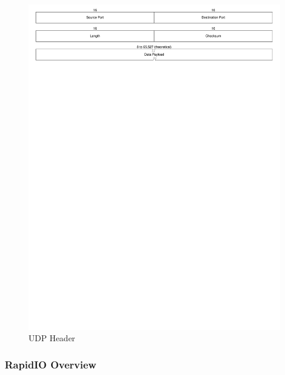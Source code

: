 \begin{landscape}
	\begin{figure}[ptb]
		\begin{centering}
			\includegraphics{Protocol/Figures/protocol-udp_header.pdf}
			\caption{UDP Header \cite{ref:2005-kozierok-tcpip_guide}}
			\label{fig:protocol:udp_header}
		\end{centering}
	\end{figure}
\end{landscape}

\subsubsection{RapidIO Overview}\label{sec:protocol:background:protocols:rapidio}

